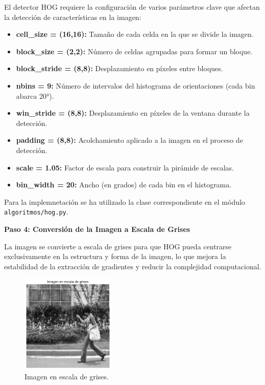 \documentclass[a4paper]{article}
\begin{document}
El detector HOG requiere la configuración de varios parámetros clave que afectan la detección de características en la imagen:
\begin{itemize}
    \item \textbf{cell\_size = (16,16):} Tamaño de cada celda en la que se divide la imagen.
    \item \textbf{block\_size = (2,2):} Número de celdas agrupadas para formar un bloque.
    \item \textbf{block\_stride = (8,8):} Desplazamiento en píxeles entre bloques.
    \item \textbf{nbins = 9:} Número de intervalos del histograma de orientaciones (cada bin abarca 20°).
    \item \textbf{win\_stride = (8,8):} Desplazamiento en píxeles de la ventana durante la detección.
    \item \textbf{padding = (8,8):} Acolchamiento aplicado a la imagen en el proceso de detección.
    \item \textbf{scale = 1.05:} Factor de escala para construir la pirámide de escalas.
    \item \textbf{bin\_width = 20:} Ancho (en grados) de cada bin en el histograma.
\end{itemize}

Para la implemnetación se ha utilizado la clase correspondiente en el módulo \texttt{algoritmos/hog.py}.
\par\vspace{0.5cm}

\textbf{Paso 4: Conversión de la Imagen a Escala de Grises}
\par\vspace{0.5cm}

La imagen se convierte a escala de grises para que HOG pueda centrarse exclusivamente en la estructura y forma de la imagen, lo que mejora la estabilidad de la extracción de gradientes y reducir la complejidad computacional.

\begin{figure}[H]
    \centering
    \includegraphics[width=0.4\textwidth]{images/hog_paso_4.png}
    \caption{Imagen en escala de grises.}
\end{figure}
\end{document}
